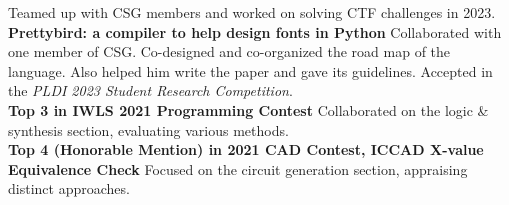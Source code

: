 \documentclass[10pt]{article}
\begin{document}
\begin{multicols}{2}
{    }
        Teamed up with CSG members and worked on solving CTF challenges in 2023.
    \\
    \noindent
    \textbf{
      \href{https://github.com/CharlesAverill/prettybird}{}
      \href{https://pldi23.sigplan.org/details/pldi-2023-src/9/Prettybird-A-DSL-for-Programmatic-Font-Compilation}{}
      Prettybird:  a compiler to help design fonts in Python
    }
        Collaborated with one member of CSG. Co-designed
        and co-organized the road map of the language. Also helped him write the paper and gave its guidelines. Accepted in the \emph{PLDI 2023 Student Research Competition}.
    \\
    \noindent
    \textbf{
      \href{https://www.iwls.org/iwls2021/}{}
      Top 3 in IWLS 2021 Programming Contest
    }
        Collaborated on the logic \& synthesis section, evaluating various methods.
    \\
    \noindent
    \textbf{
      \href{http://iccad-contest.org/2021/Winners.html}{}
      Top 4 (Honorable Mention) in 2021 CAD Contest, ICCAD X-value Equivalence Check
    }
        Focused on the circuit generation section, appraising distinct approaches.
  \end{multicols}

\end{document}
